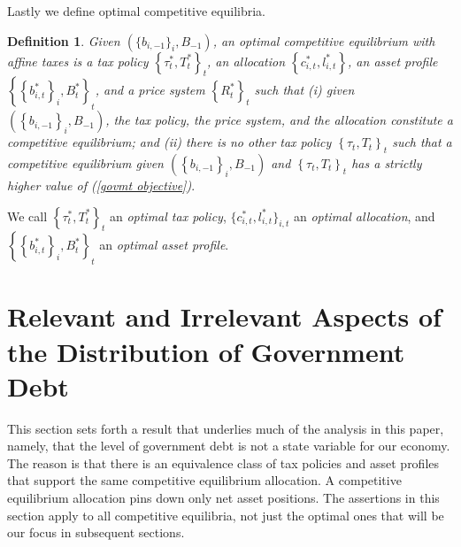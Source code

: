 \documentclass[thmsb,11pt]{article}
\newtheorem{definition}{Definition}
\begin{document}

\smallskip Lastly we define optimal competitive equilibria.

\begin{definition}
\label{Def: optimal CE affine} Given $(\{b_{i,-1}\}_{i},B_{-1})$, an
optimal competitive equilibrium with affine taxes is a tax
policy $\left\{ \tau _{t}^{\ast },T_{t}^{\ast }\right\} _{t}$, an allocation
$ \left\{ c_{i,t}^{\ast },l_{i,t}^{\ast } \right\}$, an asset profile
$\left\{\left\{b_{i,t}^{\ast }\right\}
_{i},B_{t}^{\ast }\right\} _{t}$, and a price system $\left\{ R_{t}^{\ast
}\right\} _{t}$ such that (i) given $\left( \left\{ b_{i,-1}\right\}
_{i},B_{-1}\right) $, the tax policy,  %
 the price system, %
and the allocation %
constitute a competitive equilibrium; and (ii) there is no other tax policy $%
\left\{ \tau _{t},T_{t}\right\} _{t}$ such that a competitive equilibrium
given $\left( \left\{ b_{i,-1}\right\} _{i},B_{-1}\right) $ and $\left\{
\tau _{t},T_{t}\right\} _{t}$ has a strictly higher value of (\ref{govmt
objective})$.$
\end{definition}

\smallskip We  call $\left \{ \tau _{t}^{\ast },T_{t}^{\ast }\right \}
_{t}$ an \textit{optimal tax policy}, $\{c_{i,t}^{\ast },l_{i,t}^{\ast
}\}_{i,t}$ an \textit{optimal allocation}, and $\left \{ \left \{
b_{i,t}^{\ast }\right \} _{i},B_{t}^{\ast }\right \} _{t}$ an \textit{%
optimal asset profile}.

\section{\protect\smallskip Relevant and Irrelevant Aspects of  the Distribution of Government Debt\label{sec:Ricardian101}}
%
This section sets forth  a  result that underlies much of the analysis in this paper, namely, that  the level
of government debt is not a state variable for our economy.  The reason is that there is an equivalence class of tax policies and asset profiles that support the same competitive equilibrium allocation.
A competitive  equilibrium allocation pins down only net asset  positions.
The assertions in this section apply to all competitive equilibria, not just the optimal ones that will be our focus in subsequent sections.
\end{document}
